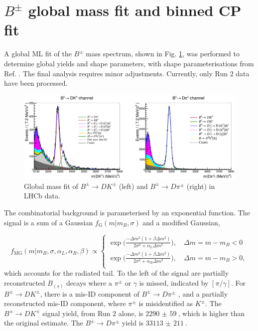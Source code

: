 \documentclass[12pt, a4paper, notitlepage, onecolumn]{article}
\begin{document}
\section{\texorpdfstring{$B^\pm$}{B} global mass fit and binned CP fit}
\noindent A global ML fit of the $B^\pm$ mass spectrum, shown in Fig. \ref{fig_Bmass_Global}, was performed to determine global yields and shape parameters, with shape parameterisations from Ref. \cite{cite_LHCbGGSZKSpipi}. The final analysis requires minor adjustments. Currently, only Run $2$ data have been processed.

\begin{figure}[H] 
  \centering
  \includegraphics[width=1\textwidth]{Plots/GlobalFit.png}
  \caption{Global mass fit of $B^\pm\to DK^\pm$ (left) and $B^\pm\to D\pi^\pm$ (right) in LHCb data.}
  \label{fig_Bmass_Global}
\end{figure}

The combinatorial background is parameterised by an exponential function. The signal is a sum of a Gaussian $f_\text{G}(m|m_B, \sigma)$ and a modified Gaussian,

\begin{equation}
  f_\text{MG}(m|m_B, \sigma, \alpha_L, \alpha_R, \beta)\propto
  \begin{cases}
    \exp\Big(\frac{-\Delta m^2(1 + \beta\Delta m^2)}{2\sigma^2 + \alpha_L\Delta m^2}\Big), \quad \Delta m = m - m_B < 0 \\
    \exp\Big(\frac{-\Delta m^2(1 + \beta\Delta m^2)}{2\sigma^2 + \alpha_R\Delta m^2}\Big), \quad \Delta m = m - m_B > 0, \\
  \end{cases}
\end{equation}
which accounts for the radiated tail. To the left of the signal are partially reconstructed $B_{(s)}$ decays where a $\pi^\pm$ or $\gamma$ is missed, indicated by $[\pi/\gamma]$. For $B^\pm\to DK^\pm$, there is a mis-ID component of $B^\pm\to D\pi^\pm$ , and a partially reconstructed mis-ID component, where $\pi^\pm$ is misidentified as $K^\pm$. The $B^\pm\to DK^\pm$ signal yield, from Run $2$ alone, is $\SI{2290(59)}{}$, which is higher than the original estimate. The $B^\pm\to D\pi^\pm$ yield is $\SI{33113(211)}{}$.
\end{document}
